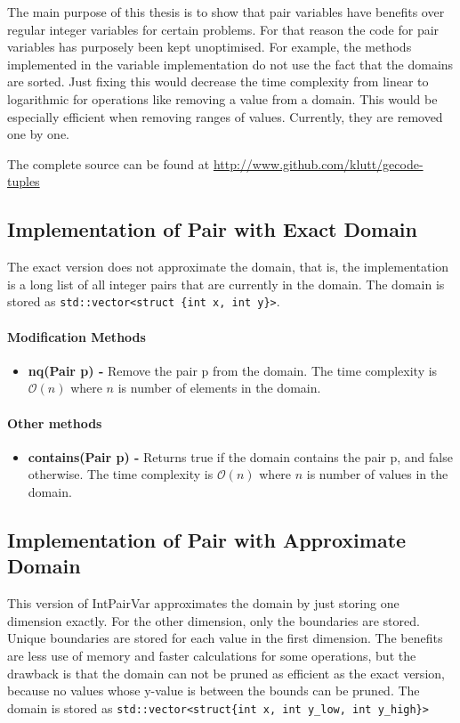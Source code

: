 \documentclass[a4paper,11pt]{article}
\begin{document}
The main purpose of this thesis is to show that pair variables have benefits over regular integer variables for certain problems. For that reason the code for pair variables has purposely been kept unoptimised. For example, the methods implemented in the variable implementation do not use the fact that the domains are sorted. Just fixing this would decrease the time complexity from linear to logarithmic for operations like removing a value from a domain. This would be especially efficient when removing ranges of values. Currently, they are removed one by one.

The complete source can be found at \url{http://www.github.com/klutt/gecode-tuples}

\subsection{Implementation of Pair with Exact Domain}
The exact version does not approximate the domain, that is, the implementation is a long list of all integer pairs that are currently in the domain. The domain is stored as \texttt{std::vector<struct \{int x, int y\}>}. 

\paragraph{Modification Methods}
\begin{itemize}
\item {\textbf{nq(Pair p) - }} Remove the pair p from the domain. The time complexity is $\mathcal{O}(n)$ where $n$ is number of elements in the domain.
\end{itemize}

\paragraph{Other methods}
\begin{itemize}
\item {\textbf{contains(Pair p) - }} Returns true if the domain contains the pair p, and false otherwise. The time complexity is  $\mathcal{O}(n)$ where $n$ is number of values in the domain.
\end{itemize}

\subsection{Implementation of Pair with Approximate Domain}
\label{sec:impapprox}
This version of IntPairVar approximates the domain by just storing one dimension exactly. For the other dimension, only the boundaries are stored. Unique boundaries are stored for each value in the first dimension. The benefits are less use of memory and faster calculations for some operations, but the drawback is that the domain can not be pruned as efficient as the exact version, because no values whose y-value is between the bounds can be pruned. The domain is stored as \texttt{std::vector<struct\{int x, int y\_low, int y\_high\}>}
\end{document}
